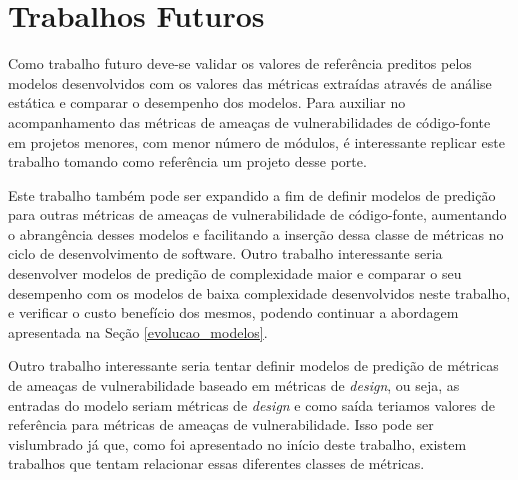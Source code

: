 \section{Trabalhos Futuros}

Como trabalho futuro deve-se validar os valores de referência preditos pelos
modelos desenvolvidos com os valores das métricas extraídas através de análise
estática e comparar o desempenho dos modelos. Para auxiliar no acompanhamento
das métricas de ameaças de vulnerabilidades de código-fonte em projetos menores,
com menor número de módulos, é interessante replicar este trabalho tomando como
referência um projeto desse porte.

Este trabalho também pode ser expandido a fim de definir modelos de predição
para outras métricas de ameaças de vulnerabilidade de código-fonte, aumentando o
abrangência desses modelos e facilitando a inserção dessa classe de métricas no
ciclo de desenvolvimento de software. Outro trabalho interessante seria
desenvolver modelos de predição de complexidade maior e comparar o seu
desempenho com os modelos de baixa complexidade desenvolvidos neste trabalho, e
verificar o custo benefício dos mesmos, podendo continuar a abordagem
apresentada na Seção \ref{evolucao_modelos}.

Outro trabalho interessante seria tentar definir modelos de predição de métricas de
ameaças de vulnerabilidade baseado em métricas de \textit{design}, ou seja, as
entradas do modelo seriam métricas de \textit{design} e como saída teriamos
valores de referência para métricas de ameaças de vulnerabilidade. Isso pode ser
vislumbrado já que, como foi apresentado no início deste trabalho, existem
trabalhos que tentam relacionar essas diferentes classes de métricas.
